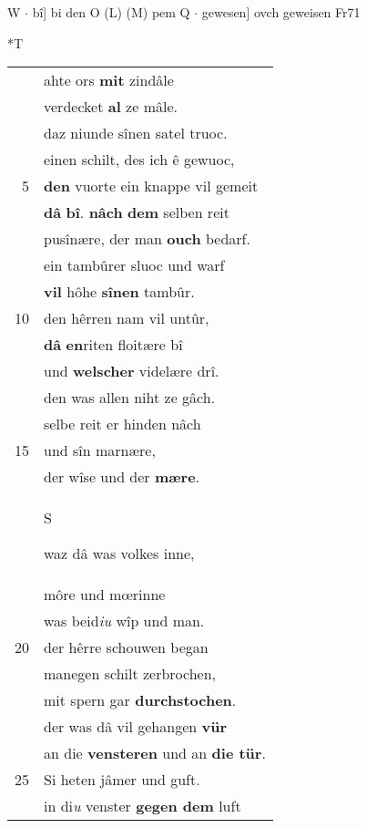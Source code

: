 \documentclass[8pt,a4paper,notitlepage]{article}
\begin{document}
\begin{table}[ht]
\begin{minipage}[t]{0.5\linewidth}
W  $\cdot$ bî] bi den O (L) (M) pem Q  $\cdot$ gewesen] ovch geweisen Fr71 \newline
\end{minipage}
\hspace{0.5cm}
\begin{minipage}[t]{0.5\linewidth}
\small
\begin{center}*T
\end{center}
\begin{tabular}{rl}
 & ahte ors \textbf{mit} zindâle\\ 
 & verdecket \textbf{al} ze mâle.\\ 
 & daz niunde sînen satel truoc.\\ 
 & einen schilt, des ich ê gewuoc,\\ 
5 & \textbf{den} vuorte ein knappe vil gemeit\\ 
 & \textbf{dâ} \textbf{bî}. \textbf{nâch} \textbf{dem} selben reit\\ 
 & pusînære, der man \textbf{ouch} bedarf.\\ 
 & ein tambûrer sluoc und warf\\ 
 & \textbf{vil} hôhe \textbf{sînen} tambûr.\\ 
10 & den hêrren nam vil untûr,\\ 
 & \textbf{dâ} \textbf{en}riten floitære bî\\ 
 & und \textbf{welscher} videlære drî.\\ 
 & den was allen niht ze gâch.\\ 
 & selbe reit er hinden nâch\\ 
15 & und sîn marnære,\\ 
 & der wîse und der \textbf{mære}.\\ 
 & \begin{large}S\end{large}waz dâ was volkes inne,\\ 
 & môre und mœrinne\\ 
 & was beid\textit{iu} wîp und man.\\ 
20 & der hêrre schouwen began\\ 
 & manegen schilt zerbrochen,\\ 
 & mit spern gar \textbf{durchstochen}.\\ 
 & der was dâ vil gehangen \textbf{vür}\\ 
 & an die \textbf{vensteren} und an \textbf{die tür}.\\ 
25 & Si heten jâmer und guft.\\ 
 & in di\textit{u} venster \textbf{gegen dem} luft\\ 

\end{tabular}
\end{minipage}
\end{table}
\end{document}
